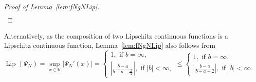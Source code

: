 \documentclass[11pt]{amsart}
\begin{document}
{\begin{proof}[Proof of Lemma~\ref{lem:fNgNLip}]
\begin{align*}
\end{align*}
\end{proof}
Alternatively, as the composition of two Lipschitz continuous functions is a Lipschitz continuous function, Lemma~\ref{lem:fNgNLip} also follows from
\begin{equation}\label{eq:psiLip}
\operatorname{Lip}(\Psi_{N}) = \sup_{x \in \mathbb{R}} \left| \Psi_{N}'(x) \right| = 
\begin{cases}
1, \text{ if } b = \infty,\\
\left| \frac{b-a}{b-a-\frac{2}{N}} \right|, \text{ if } |b| < \infty,
\end{cases}
\leq
\begin{cases}
1, \text{ if } b = \infty,\\
\left| \frac{b-a}{b-a-2} \right|, \text{ if } |b| < \infty.
\end{cases}
\end{equation}

}
\end{document}
